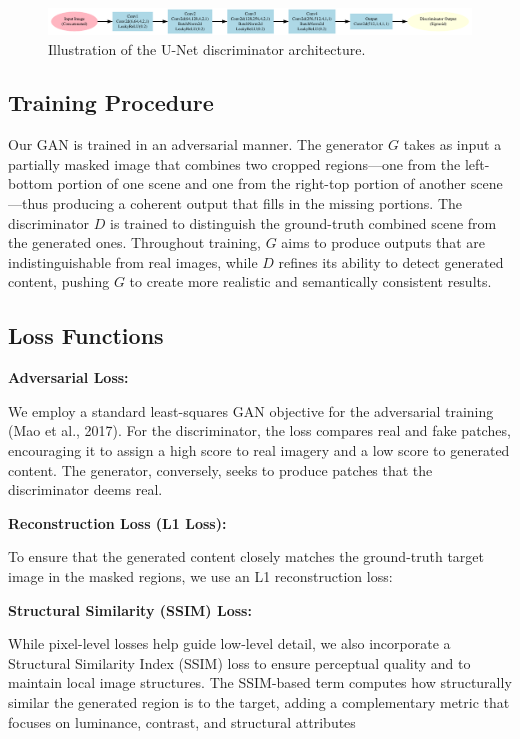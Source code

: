 \documentclass[sigconf]{acmart}
\begin{document}
\begin{figure}[h!]
    \centering
    \includegraphics[width=\linewidth]{discriminator}
    \caption{Illustration of the U-Net discriminator architecture.}
    \label{fig:discriminator}
\end{figure}

\subsection*{Training Procedure}
Our GAN is trained in an adversarial manner. The generator \( G \) takes as input a partially masked image that combines two cropped regions—one from the left-bottom portion of one scene and one from the right-top portion of another scene—thus producing a coherent output that fills in the missing portions. The discriminator \( D \) is trained to distinguish the ground-truth combined scene from the generated ones. Throughout training, \( G \) aims to produce outputs that are indistinguishable from real images, while \( D \) refines its ability to detect generated content, pushing \( G \) to create more realistic and semantically consistent results.

\subsection*{Loss Functions}
\textbf{Adversarial Loss:}

We employ a standard least-squares GAN objective for the adversarial training (Mao et al., 2017). For the discriminator, the loss compares real and fake patches, encouraging it to assign a high score to real imagery and a low score to generated content. The generator, conversely, seeks to produce patches that the discriminator deems real.

\textbf{Reconstruction Loss (L1 Loss):}

To ensure that the generated content closely matches the ground-truth target image in the masked regions, we use an L1 reconstruction loss:

\textbf{Structural Similarity (SSIM) Loss:}

While pixel-level losses help guide low-level detail, we also incorporate a Structural Similarity Index (SSIM) loss to ensure perceptual quality and to maintain local image structures. The SSIM-based term computes how structurally similar the generated region is to the target, adding a complementary metric that focuses on luminance, contrast, and structural attributes
\end{document}

